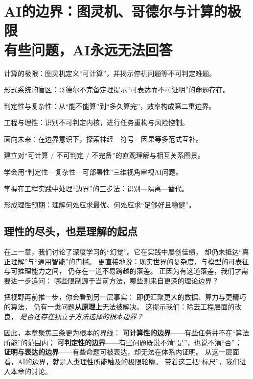 \chapter{AI的边界：图灵机、哥德尔与计算的极限 \texorpdfstring{\\}{ }有些问题，AI永远无法回答}

\begin{introduction}[本章提要]
  \item 计算的极限：图灵机定义“可计算”，并揭示停机问题等不可判定难题。
  \item 形式系统的盲区：哥德尔不完备定理提示“可表达而不可证明”的命题存在。
  \item 判定性与复杂性：从“能不能算”到“多久算完”，效率构成第二重边界。
  \item 工程与理性：识别不可判定内核，进行任务重构与风险控制。
  \item 面向未来：在边界意识下，探索神经—符号—因果等多范式互补。
\end{introduction}

\begin{introduction}[你将收获]
  \item 建立对“可计算 / 不可判定 / 不完备”的直观理解与相互关系图景。
  \item 学会用“判定性—复杂性—可部署性”三维视角审视AI问题。
  \item 掌握在工程实践中处理“边界”的三步法：识别—隔离—替代。
  \item 形成理性预期：理解何处应求最优、何处应求“足够好且稳健”。
\end{introduction}

\section*{理性的尽头，也是理解的起点}

在上一章，我们讨论了深度学习的“幻觉”。它在实践中屡创佳绩，  
却仍未抵达“真正理解”与“通用智能”的门槛。  
更直接地说：现实世界的复杂度，与模型的可表征与可推理能力之间，  
仍存在一道不易跨越的落差。  
正因为有这道落差，我们才需要进一步追问：  
哪些限制源于当前方法，哪些则来自更深的理论边界？

把视野再前推一步，你会看到另一层事实：  
即便汇聚更大的数据、算力与更精巧的算法，  
仍有一类问题\textbf{从原理上}无法被解决。  
这提示我们：除去工程层面的改良，  
\textit{是否还存在独立于方法选择的根本边界？}

因此，本章聚焦三条更为根本的界线：  
\textbf{可计算性的边界}——有些任务并不在“算法所能”的范围内；  
\textbf{可判定性的边界}——有些问题既说不清“是”，也说不清“否”；  
\textbf{证明与表达的边界}——有些命题可被表达，却无法在体系内证明。  
从这一层面看，AI的边界，就是人类理性所能触及的极限轮廓。  
带着这三把“标尺”，我们进入本章的讨论。

